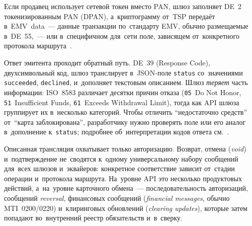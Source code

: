 Если продавец использует сетевой токен вместо PAN, шлюз заполняет DE~2
токенизированным PAN (DPAN), а~криптограмму от~TSP передаёт в~EMV~data~---
данные транзакции по~стандарту EMV, обычно размещаемые в~DE~55,~--- или
в~специфичном для~сети поле, зависящем от~конкретного протокола
маршрута~\cite{emvco-payment-tokenisation-guide}.

Ответ эмитента проходит обратный путь. DE~39 (Response Code), двухсимвольный
код, шлюз транслирует в~JSON-поле \texttt{status} со~значениями
\texttt{succeeded}, \texttt{declined}, \mbox{} и~дополняет
текстовым описанием. Шлюз \emph{теряет} часть информации: ISO~8583
различает десятки причин отказа (\texttt{05}~Do Not Honor,
\texttt{51}~Insufficient Funds, \texttt{61}~Exceeds Withdrawal Limit), тогда
как API шлюза группирует их в~несколько категорий. Чтобы отличить
\enquote{недостаточно средств} от~\enquote{карта заблокирована}, разработчику
нужно проверять поле  или его аналог в~дополнение
к~\texttt{status}; подробнее об~интерпретации кодов ответа см.~\cite{mc-tpr}.


\enlargethispage{4\baselineskip}
Описанная трансляция охватывает только авторизацию. Возврат, отмена
(\textit{void}) и~подтверждение не~сводятся к~одному универсальному набору
сообщений для~всех шлюзов и~эквайеров: конкретное соответствие
зависит от~стадии операции и~протокола маршрута. На~уровне API
это несколько продуктовых действий, а~на~уровне карточного
обмена~--- последовательность авторизаций, сообщений \textit{reversal}, финансовых
сообщений (\textit{financial messages}, обычно MTI~0200/0220) и~клиринговых
обновлений (\textit{clearing updates}), которые затем попадают
во~внутренний реестр обязательств и~в~сверку.

